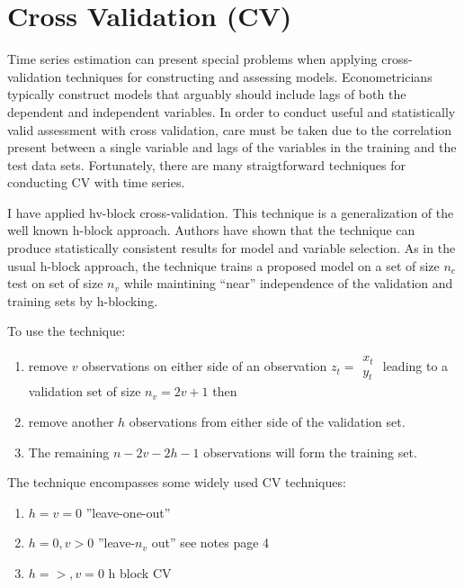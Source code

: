 \documentclass[12pt]{article}
\begin{document}
\section{Cross Validation (CV)}

\cite{e.h01:_applic}


Time series estimation can present special problems 
when applying cross-validation techniques for  constructing and
assessing models. 
Econometricians typically construct 
models that arguably should include
lags of both the dependent and independent variables.
In order to conduct  useful and statistically valid assessment
with cross validation, 
care must be taken due to the correlation present between a 
single variable and lags of the variables in the training and the test
data sets.
Fortunately,  there are many straigtforward techniques for conducting CV 
with time series.

I have applied hv-block cross-validation\cite{racine00:_consis}.
This technique is a generalization of the well known 
h-block approach. Authors have shown that
the technique can produce statistically consistent results for model and 
variable selection.
As in the usual h-block approach, the 
technique trains a proposed model on a set of 
size $n_c$ test on set of size $n_v$ while 
 maintining ``near'' independence of the 
validation and training sets by h-blocking.



To use the technique:

 \begin{enumerate}
 \item remove $v$ observations on either side of an observation $z_t=\begin{matrix}x_t\\y_t\end{matrix}$ leading to a validation set of size $n_v=2v+1$  then
 \item remove another $h$ observations from either side of the validation set. 
 \item The remaining $n-2v-2h-1$ observations will form the training set.  
 \end{enumerate}

The technique encompasses some widely used CV techniques: 
\begin{enumerate}
\item $h=v=0$ ''leave-one-out''
\item $h=0, v>0$ ''leave-$n_v$ out'' see notes page 4
\item $h=>, v=0$ h block CV
\end{enumerate}
\end{document}
